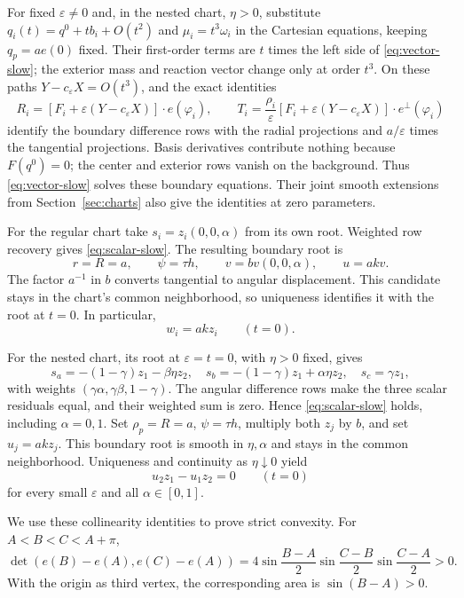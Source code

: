 \documentclass[11pt,a4paper]{article}
\numberwithin{equation}{section}
\theoremstyle{remark}
\newcommand{\eps}{\varepsilon}
\begin{document}
For fixed $\eps\ne0$ and, in the nested chart, $\eta>0$, substitute
$q_i(t)=q^0+tb_i+O(t^2)$ and $\mu_i=t^3\omega_i$ in the Cartesian equations, keeping $q_p=ae(0)$ fixed.
Their first-order terms are $t$ times the left side of \eqref{eq:vector-slow}; the exterior mass and reaction vector change only at order $t^3$.
On these paths $Y-c_\eps X=O(t^3)$, and the exact identities
\[
 R_i=[F_i+\eps(Y-c_\eps X)]\cdot e(\varphi_i),\qquad
 T_i=\frac{\rho_i}{\eps}[F_i+\eps(Y-c_\eps X)]\cdot e^\perp(\varphi_i)
\]
identify the boundary difference rows with the radial projections and $a/\eps$ times the tangential projections. Basis derivatives contribute nothing because $F(q^0)=0$; the center and exterior rows vanish on the background.
Thus \eqref{eq:vector-slow} solves these boundary equations. Their joint smooth extensions from Section~\ref{sec:charts} also give the identities at zero parameters.

For the regular chart take $s_i=z_i(0,0,\alpha)$ from its own root.
Weighted row recovery gives \eqref{eq:scalar-slow}. The resulting boundary root is
\begin{equation}\label{eq:regular-slow}
 r=R=a,\qquad \psi=\tau h,\qquad
 v=bv(0,0,\alpha),\qquad u=akv.
\end{equation}
The factor $a^{-1}$ in $b$ converts tangential to angular displacement.
This candidate stays in the chart's common neighborhood, so uniqueness identifies it with the root at $t=0$. In particular,
\begin{equation}\label{eq:regular-parallel}
 w_i=akz_i\qquad(t=0).
\end{equation}

For the nested chart, its root at $\eps=t=0$, with $\eta>0$ fixed, gives
\[
 s_a=-(1-\gamma)z_1-\beta\eta z_2,\quad
 s_b=-(1-\gamma)z_1+\alpha\eta z_2,\quad s_c=\gamma z_1,
\]
with weights $(\gamma\alpha,\gamma\beta,1-\gamma)$.
The angular difference rows make the three scalar residuals equal, and their weighted sum is zero. Hence \eqref{eq:scalar-slow} holds, including $\alpha=0,1$.
Set $\rho_p=R=a$, $\psi=\tau h$, multiply both $z_j$ by $b$, and set $u_j=akz_j$.
This boundary root is smooth in $\eta,\alpha$ and stays in the common neighborhood.
Uniqueness and continuity as $\eta\downarrow0$ yield
\begin{equation}\label{eq:nest-parallel}
 u_2z_1-u_1z_2=0\qquad(t=0)
\end{equation}
for every small $\eps$ and all $\alpha\in[0,1]$.

We use these collinearity identities to prove strict convexity.
For $A<B<C<A+\pi$,
\begin{equation}\label{eq:circle-area}
 \det(e(B)-e(A),e(C)-e(A))
 =4\sin\frac{B-A}2\sin\frac{C-B}2\sin\frac{C-A}2>0.
\end{equation}
With the origin as third vertex, the corresponding area is $\sin(B-A)>0$.
\end{document}
